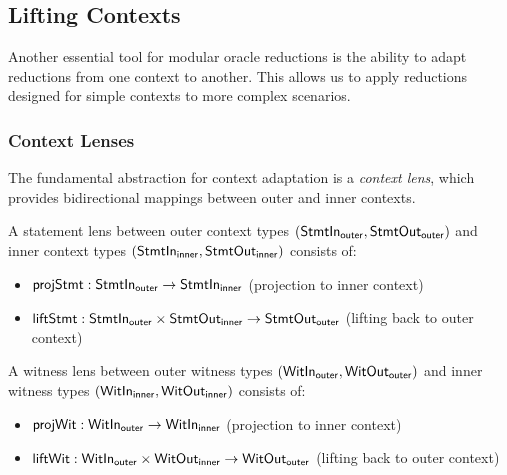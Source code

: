 \begin{theorem}
    \label{thm:soundness_compose}
\end{theorem}

\begin{theorem}
    \label{thm:knowledge_soundness_compose}
\end{theorem}

\subsection{Lifting Contexts}\label{sec:lifting_contexts}

Another essential tool for modular oracle reductions is the ability to adapt reductions from one context to another. This allows us to apply reductions designed for simple contexts to more complex scenarios.

\subsubsection{Context Lenses}

The fundamental abstraction for context adaptation is a \emph{context lens}, which provides bidirectional mappings between outer and inner contexts.

\begin{definition}
    \label{def:statement_lens}
    A statement lens between outer context types $(\mathsf{StmtIn}_{\mathsf{outer}}, \mathsf{StmtOut}_{\mathsf{outer}})$ and inner context types $(\mathsf{StmtIn}_{\mathsf{inner}}, \mathsf{StmtOut}_{\mathsf{inner}})$ consists of:
    \begin{itemize}
        \item $\mathsf{projStmt} : \mathsf{StmtIn}_{\mathsf{outer}} \to \mathsf{StmtIn}_{\mathsf{inner}}$ (projection to inner context)
        \item $\mathsf{liftStmt} : \mathsf{StmtIn}_{\mathsf{outer}} \times \mathsf{StmtOut}_{\mathsf{inner}} \to \mathsf{StmtOut}_{\mathsf{outer}}$ (lifting back to outer context)
    \end{itemize}
\end{definition}

\begin{definition}
    \label{def:witness_lens}
    A witness lens between outer witness types $(\mathsf{WitIn}_{\mathsf{outer}}, \mathsf{WitOut}_{\mathsf{outer}})$ and inner witness types $(\mathsf{WitIn}_{\mathsf{inner}}, \mathsf{WitOut}_{\mathsf{inner}})$ consists of:
    \begin{itemize}
        \item $\mathsf{projWit} : \mathsf{WitIn}_{\mathsf{outer}} \to \mathsf{WitIn}_{\mathsf{inner}}$ (projection to inner context)
        \item $\mathsf{liftWit} : \mathsf{WitIn}_{\mathsf{outer}} \times \mathsf{WitOut}_{\mathsf{inner}} \to \mathsf{WitOut}_{\mathsf{outer}}$ (lifting back to outer context)
    \end{itemize}
\end{definition}


